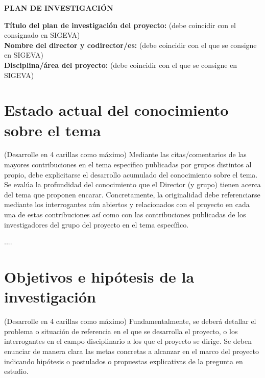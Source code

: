 \documentclass[11pt,a4paper]{article}
\begin{document}


\pagestyle{plain}

\begin{mybox}
\centering \textbf{PLAN DE INVESTIGACIÓN}
\end{mybox}

\medskip

\textbf{Título del plan de investigación del proyecto:} (debe coincidir con el consignado en SIGEVA)\\


\textbf{Nombre del director y codirector/es:} (debe coincidir con el que se consigne en SIGEVA)\\

\textbf{Disciplina/área del proyecto:} (debe coincidir con el que se consigne en SIGEVA) 

\section*{Estado actual del conocimiento sobre el tema} {\small (Desarrolle en 4 carillas como máximo) Mediante las citas/comentarios de las mayores contribuciones en el tema específico publicadas por grupos distintos al propio, debe explicitarse el desarrollo acumulado del conocimiento sobre el tema. Se evalúa la profundidad del conocimiento que el Director (y grupo) tienen acerca del tema que proponen encarar. Concretamente, la originalidad debe referenciarse mediante los interrogantes aún abiertos y relacionados con el proyecto en cada una de estas contribuciones así como con las contribuciones publicadas de los investigadores del grupo del proyecto en el tema específico.\\}

.... \cite{Uriel-tesis,G-J-S-NPC}

\section*{Objetivos e hipótesis de la investigación} {\small (Desarrolle en 4 carillas como máximo) Fundamentalmente, se deberá detallar el problema o situación de referencia en el que se desarrolla el proyecto, o los interrogantes en el campo disciplinario a los que el proyecto se dirige. Se deben enunciar de manera clara las metas concretas a alcanzar en el marco del proyecto indicando hipótesis o postulados o propuestas explicativas de la pregunta en estudio.\\}
\end{document}
